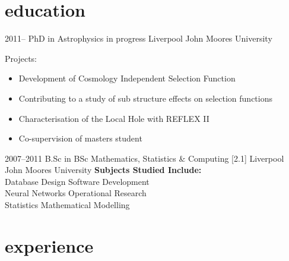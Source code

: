 \documentclass[]{cv-style}          %
\begin{document}

\section{education}

\begin{entrylist}
\entry
{2011--}
{PhD {\normalfont in Astrophysics in progress}}
{Liverpool John Moores University}
{
Projects:
\begin{itemize}
    \item Development of Cosmology Independent Selection Function
    \item Contributing to a study of sub structure effects on selection functions
    \item Characterisation of the Local Hole with REFLEX II
    \item Co-supervision of masters student
  \end{itemize}
}
{\vspace{-0.3cm}}
\entry
{2007--2011}
{B.Sc {\normalfont in BSc Mathematics, Statistics \& Computing [2.1]}}
{Liverpool John Moores University}
  {
\textbf{Subjects Studied Include:\\}
Database Design   Software Development\\
Neural Networks   Operational Research\\
Statistics        Mathematical Modelling\\
  }
\end{entrylist}

\section{experience}
\end{document}
